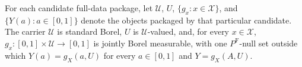 For each candidate full-data package, let \(\mathcal U\), \(U\), \(\{g_x:x\in\mathcal X\}\), and \(\{Y(a):a\in[0,1]\}\) denote the objects packaged by that particular candidate. The carrier \(\mathcal U\) is standard Borel, \(U\) is \(\mathcal U\)-valued, and, for every \(x\in\mathcal X\), \(g_x:[0,1]\times\mathcal U\to[0,1]\) is jointly Borel measurable, with one \(P^{\mathrm F}\)-null set outside which \(Y(a)=g_X(a,U)\) for every \(a\in[0,1]\) and \(Y=g_X(A,U)\).